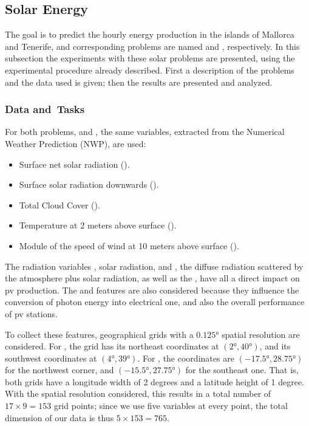 \subsection{Solar Energy}
The goal is to predict the hourly energy production in the islands of Mallorca and Tenerife, and corresponding problems are named  and , respectively. 
%
In this subsection the experiments with these solar problems are presented, using the experimental procedure already described. First a description of the problems and the data used is given; then the results are presented and analyzed.

\subsubsection*{Data and~Tasks}
For both problems,  and , the same variables, extracted from the Numerical Weather Prediction (NWP), are used:
\begin{itemize}
    \item Surface net solar {radiation} ().
    \item Surface solar radiation {downwards} ().
    \item {Total Cloud Cover} %
     ().
    \item Temperature at 2 {meters} above surface ().
    \item Module of the speed of wind at {10 meters} above surface ().
\end{itemize}
The radiation variables , solar radiation, and , the diffuse radiation scattered by the atmosphere plus solar radiation, as well as the , have all a direct impact on \acrshort{pv} production.
%
The  and  features are also considered because they influence the conversion of photon energy into electrical one, and also the overall performance of \acrshort{pv} stations.
%

To collect these features, geographical grids with a $\ang{0.125}$ spatial resolution are considered. For , the grid has its northeast coordinates at $(\ang{2}, \ang{40})$, and its southwest coordinates at $(\ang{4}, \ang{39})$. For , the coordinates are $(\ang{-17.5}, \ang{28.75})$ for the northwest corner, and $(\ang{-15.5}, \ang{27.75})$ for the southeast one.
%
That is, both grids have a longitude width of 2 degrees and a latitude height of 1 degree. With the spatial resolution considered, this results in a total number of $17 \times 9 = 153$ grid points; since we use five variables at every point, the total dimension of our data is thus $5 \times 153 = 765$. 


